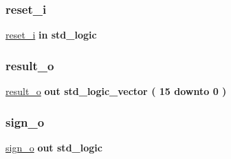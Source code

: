 \mbox{\label{classalu_a55da7e76960757f8c6842e86a28ee7be}} 
\subsubsection{\texorpdfstring{reset\+\_\+i}{reset\_i}}
{\footnotesize\ttfamily \hyperlink{classalu_a55da7e76960757f8c6842e86a28ee7be}{reset\+\_\+i} {\bfseries \textcolor{keywordflow}{in}\textcolor{vhdlchar}{ }} {\bfseries \textcolor{comment}{std\+\_\+logic}\textcolor{vhdlchar}{ }} \hspace{0.3cm}{\ttfamily [Port]}}

\mbox{\label{classalu_a4c4aa4e657b005516ee13f5b57054b9a}} 
\subsubsection{\texorpdfstring{result\+\_\+o}{result\_o}}
{\footnotesize\ttfamily \hyperlink{classalu_a4c4aa4e657b005516ee13f5b57054b9a}{result\+\_\+o} {\bfseries \textcolor{keywordflow}{out}\textcolor{vhdlchar}{ }} {\bfseries \textcolor{comment}{std\+\_\+logic\+\_\+vector}\textcolor{vhdlchar}{ }\textcolor{vhdlchar}{(}\textcolor{vhdlchar}{ }\textcolor{vhdlchar}{ } \textcolor{vhdldigit}{15} \textcolor{vhdlchar}{ }\textcolor{keywordflow}{downto}\textcolor{vhdlchar}{ }\textcolor{vhdlchar}{ } \textcolor{vhdldigit}{0} \textcolor{vhdlchar}{ }\textcolor{vhdlchar}{)}\textcolor{vhdlchar}{ }} \hspace{0.3cm}{\ttfamily [Port]}}

\mbox{\label{classalu_ad931fb1d7982869689b7072b46bf5f0b}} 
\subsubsection{\texorpdfstring{sign\+\_\+o}{sign\_o}}
{\footnotesize\ttfamily \hyperlink{classalu_ad931fb1d7982869689b7072b46bf5f0b}{sign\+\_\+o} {\bfseries \textcolor{keywordflow}{out}\textcolor{vhdlchar}{ }} {\bfseries \textcolor{comment}{std\+\_\+logic}\textcolor{vhdlchar}{ }} \hspace{0.3cm}{\ttfamily [Port]}}

